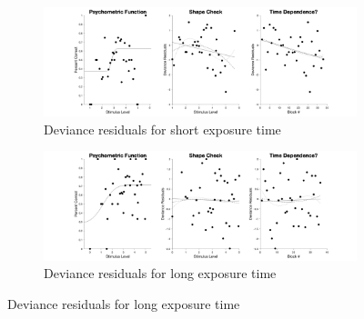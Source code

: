 \documentclass{article}
\begin{document}
\begin{figure}[!hb]
    \begin{subfigure}{\textwidth}
        \centering
        \includegraphics[width = \linewidth]{Thesis/plots/gof/segDist/segDist_go_short_deviance.png}
        \caption{Deviance residuals for short exposure time}
    \end{subfigure}
    
    \begin{subfigure}{\textwidth}
        \centering
        \includegraphics[width = \linewidth]{Thesis/plots/gof/segDist/segDist_go_long_deviance.png}
        \caption{Deviance residuals for long exposure time}
    \end{subfigure}
    
\end{figure}
\clearpage
\end{document}
